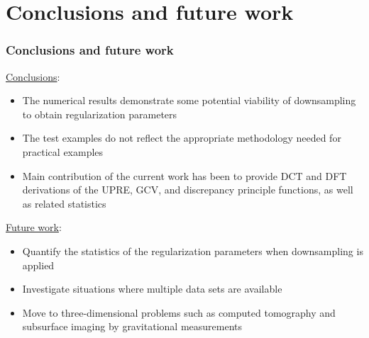 \documentclass[t]{beamer}
\begin{document}
\section{Conclusions and future work}

\begin{frame}
\frametitle{Conclusions and future work}
\underline{Conclusions}:
\begin{itemize}
\item The numerical results demonstrate some potential viability of downsampling to obtain regularization parameters
\item The test examples do not reflect the appropriate methodology needed for practical examples
\item Main contribution of the current work has been to provide DCT and DFT derivations of the UPRE, GCV, and discrepancy principle functions, as well as related statistics
\end{itemize}
\underline{Future work}:
\begin{itemize}
\item Quantify the statistics of the regularization parameters when downsampling is applied \\
\item Investigate situations where multiple data sets are available \cite{ChungEspanol2017} \\
\item Move to three-dimensional problems such as computed tomography and subsurface imaging by gravitational measurements \cite{ABT}
\end{itemize}
\end{frame}

%



\end{document}
